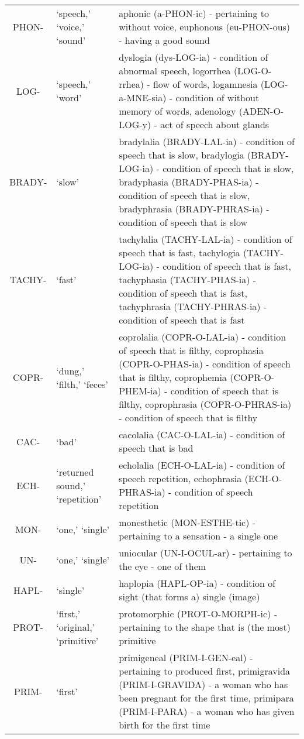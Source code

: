 \begin{longtable}{c | p{} | p{}}
        PHON- & `speech,' `voice,' `sound' & aphonic (a-PHON-ic) - pertaining to without voice, euphonous (eu-PHON-ous) - having a good sound \\
        LOG- & `speech,' `word' & dyslogia (dys-LOG-ia) - condition of abnormal speech, logorrhea (LOG-O-rrhea) - flow of words, logamnesia (LOG-a-MNE-sia) - condition of without memory of words, adenology (ADEN-O-LOG-y) - act of speech about glands \\
        BRADY- & `slow' & bradylalia (BRADY-LAL-ia) - condition of speech that is slow, bradylogia (BRADY-LOG-ia) - condition of speech that is slow, bradyphasia (BRADY-PHAS-ia) - condition of speech that is slow, bradyphrasia (BRADY-PHRAS-ia) - condition of speech that is slow \\
        TACHY- & `fast' & tachylalia (TACHY-LAL-ia) - condition of speech that is fast, tachylogia (TACHY-LOG-ia) - condition of speech that is fast, tachyphasia (TACHY-PHAS-ia) - condition of speech that is fast, tachyphrasia (TACHY-PHRAS-ia) - condition of speech that is fast \\
        COPR- & `dung,' `filth,' `feces' & coprolalia (COPR-O-LAL-ia) - condition of speech that is filthy, coprophasia (COPR-O-PHAS-ia) - condition of speech that is filthy, coprophemia (COPR-O-PHEM-ia) - condition of speech that is filthy, coprophrasia (COPR-O-PHRAS-ia) - condition of speech that is filthy \\
        CAC- & `bad' & cacolalia (CAC-O-LAL-ia) - condition of speech that is bad \\
        ECH- & `returned sound,' `repetition' & echolalia (ECH-O-LAL-ia) - condition of speech repetition, echophrasia (ECH-O-PHRAS-ia) - condition of speech repetition \\
        MON- & `one,' `single' & monesthetic (MON-ESTHE-tic) - pertaining to a sensation - a single one \\
        UN- & `one,' `single' & uniocular (UN-I-OCUL-ar) - pertaining to the eye - one of them \\
        HAPL- & `single' & haplopia (HAPL-OP-ia) - condition of sight (that forms a) single (image) \\
        PROT- & `first,' `original,' `primitive' & protomorphic (PROT-O-MORPH-ic) - pertaining to the shape that is (the most) primitive \\
        PRIM- & `first' & primigeneal (PRIM-I-GEN-eal) - pertaining to produced first, primigravida (PRIM-I-GRAVIDA) - a woman who has been pregnant for the first time, primipara (PRIM-I-PARA) - a woman who has given birth for the first time \\

\end{longtable}
